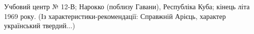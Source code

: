  
 
 
 
 


Учбовий центр № 12-В; Нарокко (поблизу Гавани), Республіка Куба; кінець літа
1969 року.  (Із характеристики-рекомендації: Справжній Арієць, характер
український твердий...)
